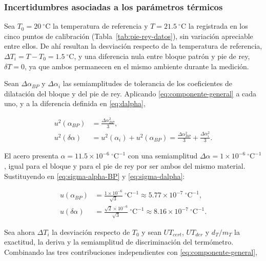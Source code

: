 \subsubsection{Incertidumbres asociadas a los parámetros térmicos}

Sea $T_0 = 20\ ^\circ\text{C}$ la temperatura de referencia y $T = 21.5\ ^\circ\text{C}$
la registrada en los cinco puntos de calibración
(Tabla~\ref{tab:pie-rey-datos}), sin variación apreciable entre ellos. De ahí
resultan la desviación respecto de la temperatura de referencia,
$\Delta T_i = T - T_0 = 1.5\ ^\circ\text{C}$, y una diferencia nula entre bloque
patrón y pie de rey, $\delta T = 0$, ya que ambos permanecen en el mismo ambiente
durante la medición.

Sean $\Delta\alpha_{BP}$ y $\Delta\alpha_i$ las semiamplitudes de tolerancia de los
coeficientes de dilatación del bloque y del pie de rey. Aplicando
\eqref{eq:componente-general} a cada uno, y a la diferencia definida en
\eqref{eq:dalpha},

\begin{align}
    u^2(\alpha_{BP}) &= \frac{\Delta\alpha_{BP}^2}{3},
    \label{eq:sigma-alpha-BP} \\
    u^2(\delta\alpha) &= u^2(\alpha_i) + u^2(\alpha_{BP})
    = \frac{\Delta\alpha_{BP}^2}{3} + \frac{\Delta\alpha_i^2}{3}.
    \label{eq:sigma-dalpha}
\end{align}

El acero presenta $\alpha = 11.5\times10^{-6}\ ^\circ\text{C}^{-1}$ con una
semiamplitud $\Delta\alpha = 1\times10^{-6}\ ^\circ\text{C}^{-1}$, igual para el
bloque y para el pie de rey por ser ambos del mismo material. Sustituyendo en
\eqref{eq:sigma-alpha-BP} y \eqref{eq:sigma-dalpha}:

\begin{align}
    u(\alpha_{BP}) &= \frac{1\times10^{-6}}{\sqrt{3}}\ ^\circ\text{C}^{-1}
    \approx 5.77\times10^{-7}\ ^\circ\text{C}^{-1},
    \label{eq:sigma-alpha-BP-valor} \\
    u(\delta\alpha) &= \frac{\sqrt{2}\times10^{-6}}{\sqrt{3}}\ ^\circ\text{C}^{-1}
    \approx 8.16\times10^{-7}\ ^\circ\text{C}^{-1}.
    \label{eq:sigma-dalpha-valor}
\end{align}

Sea ahora $\Delta T_i$ la desviación respecto de $T_0$ y sean $UT_{cert}$, $UT_{der}$
y $d_T/m_T$ la exactitud, la deriva y la semiamplitud de discriminación del
termómetro. Combinando las tres contribuciones independientes con
\eqref{eq:componente-general},

